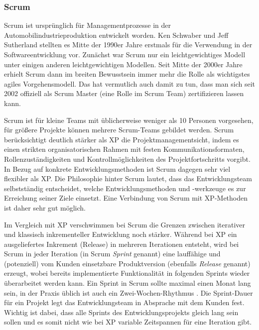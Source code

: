 \clearpage %

\subsubsection{Scrum}
\label{sec:Kap-2.2.3.2}


Scrum ist ursprünglich für Managementprozesse in der Automobilindustrieproduktion entwickelt worden. Ken Schwaber und Jeff Sutherland  stellten es Mitte der 1990er Jahre erstmals für die Verwendung in der Softwareentwicklung vor. Zunächst war Scrum nur ein leichtgewichtiges Modell unter einigen anderen leichtgewichtigen Modellen. Seit Mitte der 2000er Jahre erhielt Scrum dann im breiten Bewusstsein immer mehr die Rolle als wichtigstes agiles Vorgehensmodell. Das hat vermutlich auch damit zu tun, dass man sich seit 2002 offiziell als Scrum Master (eine Rolle im Scrum Team) zertifizieren lassen kann. 

Scrum ist für kleine Teams mit üblicherweise weniger als 10 Personen \cite[5]{sch20} vorgesehen, für größere Projekte können mehrere Scrum-Teams gebildet werden. Scrum berücksichtigt deutlich stärker als XP die Projektmanagementsicht, indem es einen strikten organisatorischen Rahmen mit festen Kommunikationsformaten, Rollenzuständigkeiten und Kontrollmöglichkeiten des Projektfortschritts vorgibt. In Bezug auf konkrete Entwicklungsmethoden ist Scrum dagegen sehr viel flexibler als XP. Die Philosophie hinter Scrum lautet, dass das Entwicklungsteam selbstständig entscheidet, welche Entwicklungsmethoden und -werkzeuge es zur Erreichung seiner Ziele einsetzt. Eine Verbindung von Scrum mit XP-Methoden ist daher sehr gut möglich. 

Im  Vergleich mit XP verschwimmen bei Scrum die Grenzen zwischen iterativer und klassisch inkrementeller Entwicklung noch stärker. Während bei XP ein ausgeliefertes Inkrement (Release) in mehreren Iterationen entsteht, wird bei Scrum in jeder Iteration (in Scrum \textit{Sprint} genannt) 
eine lauffähige und (potenziell) vom Kunden einsetzbare Produktversion (ebenfalls \textit{Release} genannt) erzeugt, wobei bereits implementierte Funktionalität in folgenden Sprints wieder überarbeitet werden kann. Ein Sprint in Scrum sollte maximal einen Monat lang sein, in der Praxis üblich ist auch ein Zwei-Wochen-Rhythmus \cite[104]{kom17}. Die Sprint-Dauer für ein Projekt legt das Entwicklungsteam in Absprache mit dem Kunden fest. Wichtig ist dabei, dass alle Sprints des Entwicklungsprojekts gleich lang sein sollen und es somit nicht wie bei XP variable Zeitspannen für eine Iteration gibt. 

